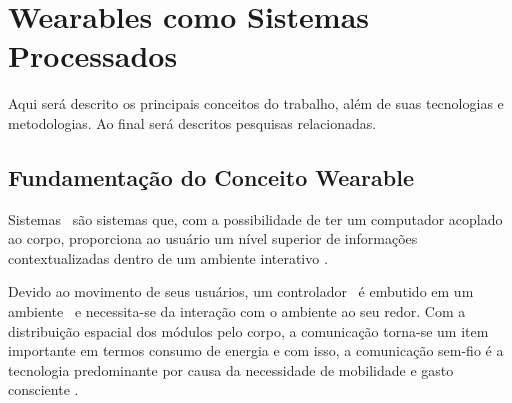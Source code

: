 \section{Wearables como Sistemas Processados} \label{chap:revisao_bibliografica}

   Aqui será descrito os principais conceitos do trabalho, além de suas tecnologias e metodologias. Ao final será descritos pesquisas relacionadas.

   \subsection{Fundamentação do Conceito Wearable}
      Sistemas \wearables\ são sistemas que, com a possibilidade de ter um computador acoplado ao corpo, proporciona ao usuário um nível superior de informações contextualizadas dentro de um ambiente interativo \cite{Amorim2017}.


      Devido ao movimento de seus usuários, um controlador \wearable\ é embutido em um ambiente \mobile\ e necessita-se da interação com o ambiente ao seu redor.
      Com a distribuição espacial dos módulos pelo corpo, a comunicação torna-se um item importante em termos consumo de energia e com isso,
      a comunicação sem-fio é a tecnologia predominante por causa da necessidade de mobilidade e gasto consciente \cite{Plessl2003, Kymissis1998}.



